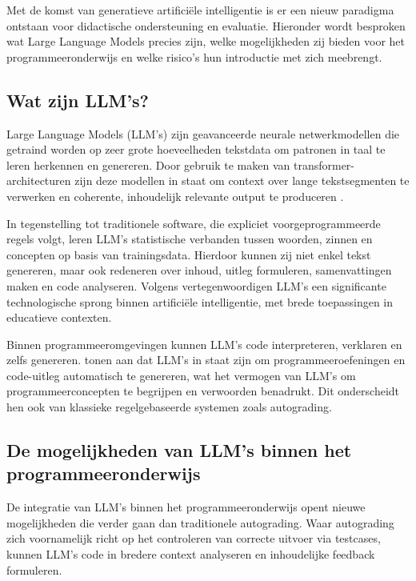 Met de komst van generatieve artificiële intelligentie is er een nieuw paradigma ontstaan voor didactische ondersteuning en evaluatie. Hieronder wordt besproken wat Large Language Models precies zijn, welke mogelijkheden zij bieden voor het programmeeronderwijs en welke risico's hun introductie met zich meebrengt.

\subsection{Wat zijn LLM's?}

Large Language Models (LLM's) zijn geavanceerde neurale netwerkmodellen die getraind worden op zeer grote hoeveelheden tekstdata om patronen in taal te leren herkennen en genereren. Door gebruik te maken van transformer-architecturen zijn deze modellen in staat om context over lange tekstsegmenten te verwerken en coherente, inhoudelijk relevante output te produceren \autocite{Kasneci2023}. 

\vspace{1em}

In tegenstelling tot traditionele software, die expliciet voorgeprogrammeerde regels volgt, leren LLM's statistische verbanden tussen woorden, zinnen en concepten op basis van trainingsdata. Hierdoor kunnen zij niet enkel tekst genereren, maar ook redeneren over inhoud, uitleg formuleren, samenvattingen maken en code analyseren. Volgens \textcite{Kasneci2023} vertegenwoordigen LLM's een significante technologische sprong binnen artificiële intelligentie, met brede toepassingen in educatieve contexten.

\vspace{1em}

Binnen programmeeromgevingen kunnen LLM's code interpreteren, verklaren en zelfs genereren. \textcite{Sarsa2022} tonen aan dat LLM's in staat zijn om programmeeroefeningen en code-uitleg automatisch te genereren, wat het vermogen van LLM's om programmeerconcepten te begrijpen en verwoorden benadrukt. Dit onderscheidt hen ook van klassieke regelgebaseerde systemen zoals autograding.

\subsection{De mogelijkheden van LLM's binnen het programmeeronderwijs}

De integratie van LLM's binnen het programmeeronderwijs opent nieuwe mogelijkheden die verder gaan dan traditionele autograding. Waar autograding zich voornamelijk richt op het controleren van correcte uitvoer via testcases, kunnen LLM's code in bredere context analyseren en inhoudelijke feedback formuleren.

